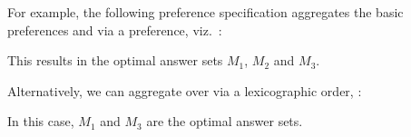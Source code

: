 For example, the following preference specification aggregates the basic preferences  and 
via a  preference, viz.~: 
%

%
This results in the optimal answer sets $M_1$, $M_2$ and $M_3$.

Alternatively,
we can aggregate  over 
via a lexicographic order, :

In this case, $M_1$ and $M_3$ are the optimal answer sets.



